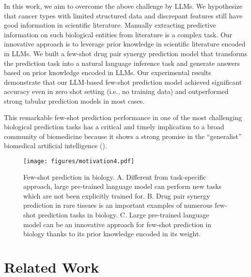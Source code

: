 {In this work, we aim to overcome the above challenge by LLMs. We hypothesize that cancer types with limited structured data and discrepant features still have good information in scientific literature.  Manually extracting predictive information on such biological entities from literature is a complex task. Our innovative approach is to leverage prior knowledge in scientific literature encoded in LLMs. We built a few-shot drug pair synergy prediction model that transforms the prediction task into a natural language inference task and generate answers based on prior knowledge encoded in LLMs. Our experimental results demonstrate that our LLM-based few-shot prediction model achieved significant accuracy even in zero shot setting (i.e., no training data) and outperformed strong tabular prediction models in most cases. 

This remarkable few-shot prediction performance in one of the most challenging biological prediction tasks has a critical and timely implication to a broad community of biomedicine because it shows a strong promise in the ``generalist'' biomedical artificial intelligence (\cite{Moor2023-dp}). 

\begin{figure}[t]
  \centering 
  \texttt{[image: figures/motivation4.pdf]}
  \caption{Few-shot prediction in biology. A. Different from task-specific approach, large pre-trained language model can perform new tasks which are not been explicitly trained for. B. Drug pair synergy prediction in rare tissues is an important examples of numerous few-shot prediction tasks in biology. C. Large pre-trained language model can be an innovative approach for few-shot prediction in biology thanks to its prior knowledge encoded in its weight.}
  \label{fig:motivation} 
\end{figure} 


\section{Related Work}
\label{sec:related_works}

}
